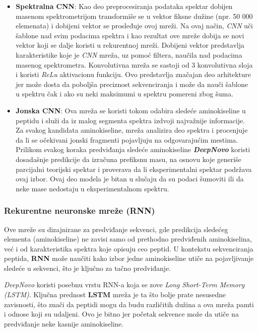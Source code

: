 \documentclass[12pt,oneside]{memoir}
\begin{document}
\begin{itemize}
\item \textbf{Spektralna CNN}: Kao deo preprocesiranja podataka spektar dobijen masenom spektrometrijom transformiše se u vektor fiksne dužine (npr. 50 000 elemenata) i dobijeni vektor se prosleđuje ovoj mreži. Na ovaj način, \emph{CNN} uči šablone nad svim podacima spektra i kao rezultat ove mreže dobija se novi vektor koji se dalje koristi u rekurentnoj mreži. Dobijeni vektor predstavlja karakteristike koje je \emph{CNN} mreža, uz pomoć filtera, naučila nad podacima masenog spektrometra. Konvolutivna mreža se sastoji od 3 konvolutivna sloja i koristi \emph{ReLu} aktivacionu funkciju. Ovo predstavlja značajan deo arhitekture jer može dosta da poboljša preciznost sekvenciranja i može da nauči šablone u spektru čak i ako su neki maksimumi u spektru pomereni zbog šuma.
\item \textbf{Jonska CNN}: Ova mreža se koristi tokom odabira sledeće aminokiseline u peptidu i služi da iz malog segmenta spektra izdvoji najvažnije informacije. Za svakog kandidata aminokiseline, mreža analizira deo spektra i procenjuje da li se očekivani jonski fragmenti pojavljuju na odgovarajućim mestima. Prilikom svakog koraka predviđanja sledeće aminokiseline \textbf{\emph{DeepNovo}} koristi dosadašnje predikcije da izračuna prefiksnu masu, na osnovu koje generiše parcijalni teorijski spektar i proverava da li eksperimentalni spektar podržava ovaj izbor. Ovaj deo modela je bitan u slučaju da su podaci šumoviti ili da neke mase nedostaju u eksperimentalnom spektru.
\end{itemize}

\subsubsection{Rekurentne neuronske mreže (RNN)}
Ove mreže su dizajnirane za predviđanje sekvenci, gde predikcija sledećeg elementa (aminokiseline) ne zavisi samo od prethodno predviđenih aminokiselina, već i od karakteristika spektra koje opisuju ceo peptid. U kontekstu sekvenciranja peptida, \textbf{RNN} može naučiti kako izbor jedne aminokiseline utiče na pojavljivanje sledeće u sekvenci, što je ključno za tačno predviđanje.

\emph{DeepNovo} koristi posebnu vrstu RNN-a koja se zove \emph{Long Short-Term Memory (LSTM)}. Ključna prednost \textbf{LSTM} mreža je ta što bolje prate nesusedne zavisnosti, što znači da peptidi mogu da budu različitih dužina a ova mreža pamti i odnose koji su udaljeni. Ovo je bitno jer početak sekvence može da utiče na predviđanje neke kasnije aminokiseline.
\end{document}
